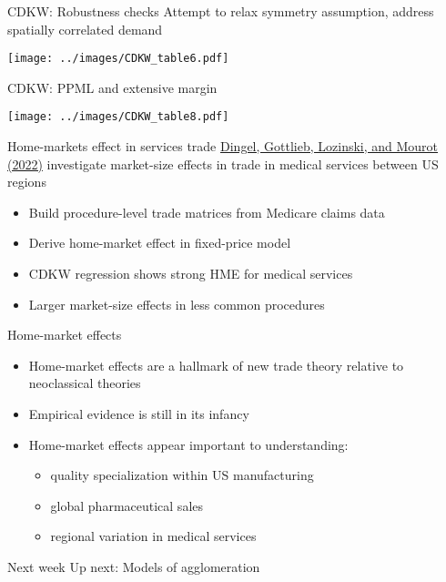 \documentclass[10pt,notes=hide]{beamer}
\begin{document}
\begin{frame}{CDKW: Robustness checks}
Attempt to relax symmetry assumption, address spatially correlated demand
\begin{center}\texttt{[image: ../images/CDKW\_table6.pdf]}\end{center}
\end{frame}
\begin{frame}{CDKW: PPML and extensive margin}
\begin{center}\texttt{[image: ../images/CDKW\_table8.pdf]}\end{center}
\end{frame}
\begin{frame}{Home-markets effect in services trade}
\href{http://www.jdingel.com/research/DGLM_MSTMS.pdf}{Dingel, Gottlieb, Lozinski, and Mourot (2022)}
investigate market-size effects in trade in medical services between US regions
\begin{itemize}
\item Build procedure-level trade matrices from Medicare claims data
\item Derive home-market effect in fixed-price model
\item CDKW regression shows strong HME for medical services
\item Larger market-size effects in less common procedures
\end{itemize}
\end{frame}
\begin{frame}{Home-market effects}
\begin{itemize}
	\item Home-market effects are a hallmark of new trade theory relative to neoclassical theories
	\item Empirical evidence is still in its infancy
	\item Home-market effects appear important to understanding:
	\begin{itemize}
		\item quality specialization within US manufacturing
		\item global pharmaceutical sales
		\item regional variation in medical services
	\end{itemize}
\end{itemize}
\end{frame}
\begin{frame}{Next week}
Up next: Models of agglomeration
\end{frame}
\end{document}
